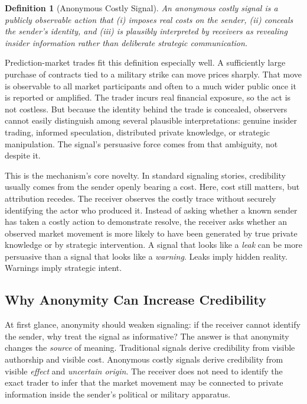 \documentclass[12pt]{article}
\newtheorem{definition}{Definition}
\begin{document}
\begin{definition}[Anonymous Costly Signal]
An \textit{anonymous costly signal} is a publicly observable action that (i) imposes real costs on the sender, (ii) conceals the sender's identity, and (iii) is plausibly interpreted by receivers as revealing insider information rather than deliberate strategic communication.
\end{definition}

Prediction-market trades fit this definition especially well. A sufficiently large purchase of contracts tied to a military strike can move prices sharply. That move is observable to all market participants and often to a much wider public once it is reported or amplified. The trader incurs real financial exposure, so the act is not costless. But because the identity behind the trade is concealed, observers cannot easily distinguish among several plausible interpretations: genuine insider trading, informed speculation, distributed private knowledge, or strategic manipulation. The signal's persuasive force comes from that ambiguity, not despite it.

This is the mechanism's core novelty. In standard signaling stories, credibility usually comes from the sender openly bearing a cost. Here, cost still matters, but attribution recedes. The receiver observes the costly trace without securely identifying the actor who produced it. Instead of asking whether a known sender has taken a costly action to demonstrate resolve, the receiver asks whether an observed market movement is more likely to have been generated by true private knowledge or by strategic intervention. A signal that looks like a \textit{leak} can be more persuasive than a signal that looks like a \textit{warning}. Leaks imply hidden reality. Warnings imply strategic intent.

\subsection{Why Anonymity Can Increase Credibility}

At first glance, anonymity should weaken signaling: if the receiver cannot identify the sender, why treat the signal as informative? The answer is that anonymity changes the \textit{source} of meaning. Traditional signals derive credibility from visible authorship and visible cost. Anonymous costly signals derive credibility from visible \textit{effect} and \textit{uncertain origin}. The receiver does not need to identify the exact trader to infer that the market movement may be connected to private information inside the sender's political or military apparatus.
\end{document}
